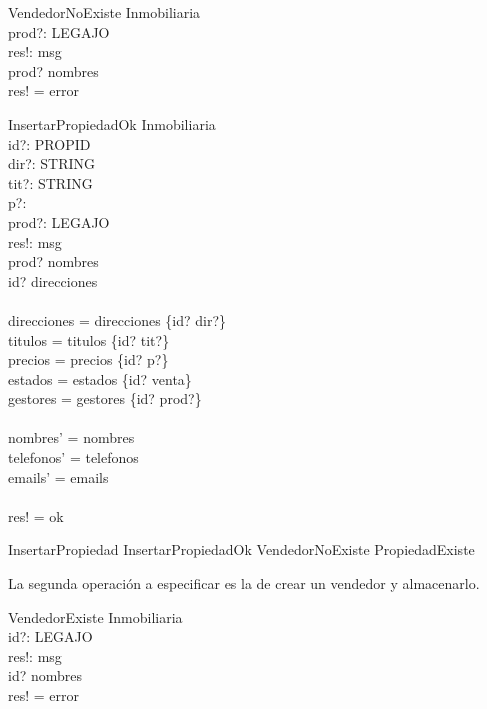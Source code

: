 \begin{schema}{VendedorNoExiste}
\Xi Inmobiliaria \\
prod?: LEGAJO \\
res!: msg \\
\where
prod? \notin \dom nombres \\
res! = error \\
\end{schema}

\begin{schema}{InsertarPropiedadOk}
\Delta Inmobiliaria \\
id?: PROPID \\
dir?: STRING \\
tit?: STRING \\
p?: \nat \\
prod?: LEGAJO \\
res!: msg \\
\where
prod? \in \dom nombres \\
id? \notin \dom direcciones \\
\ \\
direcciones =  direcciones \cup \{id? \mapsto dir?\}  \\
titulos = titulos \cup \{id? \mapsto tit?\}  \\
precios = precios \cup \{id? \mapsto p?\}  \\
estados = estados \cup \{id? \mapsto venta\}  \\
gestores = gestores \cup \{id? \mapsto prod?\}  \\
\ \\
nombres' =  nombres  \\
telefonos' =  telefonos  \\
emails' =  emails  \\
\ \\
res! = ok \\
\end{schema}

\begin{zed}
InsertarPropiedad  InsertarPropiedadOk \lor VendedorNoExiste \lor PropiedadExiste
\end{zed}

La segunda operación a especificar es la de crear un vendedor y almacenarlo.

\begin{schema}{VendedorExiste}
\Xi Inmobiliaria \\
id?: LEGAJO \\
res!: msg \\
\where
id? \in \dom nombres \\
res! = error \\
\end{schema}

